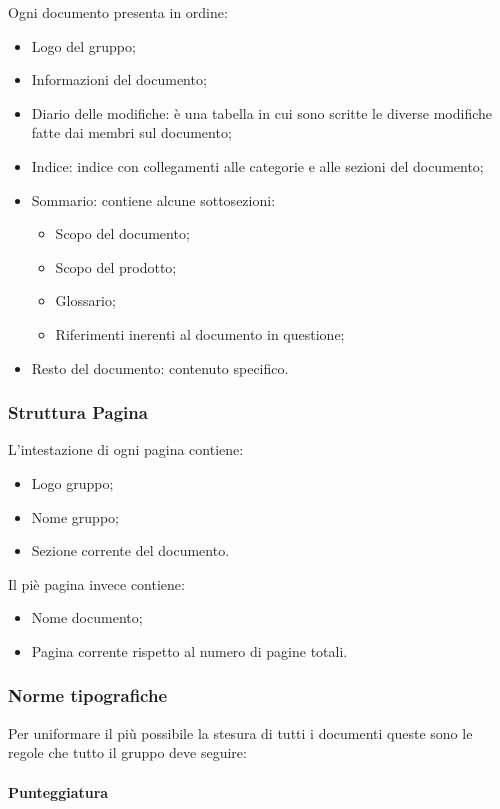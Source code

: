 \documentclass{scalatekids-article}
\begin{document}
Ogni documento presenta in ordine:
\begin{itemize}
\item Logo del gruppo;
\item Informazioni del documento;
\item Diario delle modifiche: è una tabella in cui sono scritte le diverse modifiche fatte dai membri sul documento;
\item Indice: indice con collegamenti alle categorie e alle sezioni del documento;
\item Sommario: contiene alcune sottosezioni:
  \begin{itemize}
  \item Scopo del documento;
  \item Scopo del prodotto;
  \item Glossario;
  \item Riferimenti inerenti al documento in questione;
  \end{itemize}
\item Resto del documento: contenuto specifico.
\end{itemize}

\subsubsection{Struttura Pagina}

L'intestazione di ogni pagina contiene:
\begin{itemize}
\item Logo gruppo;
\item Nome gruppo;
\item Sezione corrente del documento.
\end{itemize}
Il piè pagina invece contiene:
\begin{itemize}
\item Nome documento;
\item Pagina corrente rispetto al numero di pagine totali.
\end{itemize}

\subsubsection{Norme tipografiche}

Per uniformare il più possibile la stesura di tutti i documenti queste sono le regole che tutto il gruppo deve seguire:

\paragraph{Punteggiatura}
\end{document}
